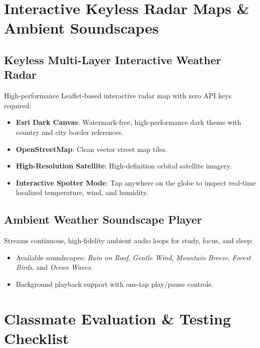 \documentclass[11pt,a4paper]{article}
\begin{document}
\section{Interactive Keyless Radar Maps \& Ambient Soundscapes}

\subsection{Keyless Multi-Layer Interactive Weather Radar}
High-performance Leaflet-based interactive radar map with zero API keys required:
\begin{itemize}[leftmargin=1.5em, itemsep=2pt]
  \item \textbf{Esri Dark Canvas}: Watermark-free, high-performance dark theme with country and city border references.
  \item \textbf{OpenStreetMap}: Clean vector street map tiles.
  \item \textbf{High-Resolution Satellite}: High-definition orbital satellite imagery.
  \item \textbf{Interactive Spotter Mode}: Tap anywhere on the globe to inspect real-time localized temperature, wind, and humidity.
\end{itemize}

\subsection{Ambient Weather Soundscape Player}
Streams continuous, high-fidelity ambient audio loops for study, focus, and sleep:
\begin{itemize}[leftmargin=1.5em, itemsep=2pt]
  \item Available soundscapes: \emph{Rain on Roof}, \emph{Gentle Wind}, \emph{Mountain Breeze}, \emph{Forest Birds}, and \emph{Ocean Waves}.
  \item Background playback support with one-tap play/pause controls.
\end{itemize}

\section{Classmate Evaluation \& Testing Checklist}
\end{document}
